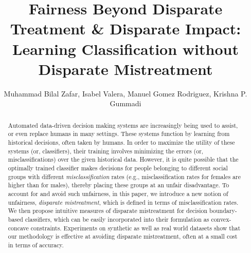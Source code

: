 \documentclass[letterpaper]{sig-alternate-2013}
\begin{document}
\title{
Fairness Beyond Disparate Treatment \& Disparate Impact: Learning Classification without Disparate Mistreatment
}

\author{
    \alignauthor Muhammad Bilal Zafar, Isabel Valera, Manuel Gomez Rodriguez, Krishna P. Gummadi\\
    \vspace{1mm}
    \vspace{1mm}
}



\maketitle


\begin{abstract}

Automated data-driven decision making systems are increasingly being
used to assist, or even replace humans in many settings. These systems
function by learning from historical decisions, often taken by
humans. In order to maximize the utility of these systems (or,
classifiers), their training involves minimizing the errors (or,
misclassifications) over the given historical data. However, it is
quite possible that the optimally trained classifier makes decisions
for people belonging to different social groups with different {\it
  misclassification} rates (e.g., misclassification rates for females
are higher than for males), thereby placing these groups at an unfair
disadvantage. To account for and avoid such unfairness, in this paper,
we introduce a new notion of unfairness, {\it disparate mistreatment},
which is defined in terms of misclassification rates. We then propose
intuitive measures of disparate mistreatment for decision
boundary-based classifiers, which can be easily incorporated into
their formulation as convex-concave constraints. Experiments on
synthetic as well as real world datasets show that our methodology is
effective at avoiding disparate mistreatment, often at a small cost in
terms of accuracy.



\end{abstract}
\end{document}
